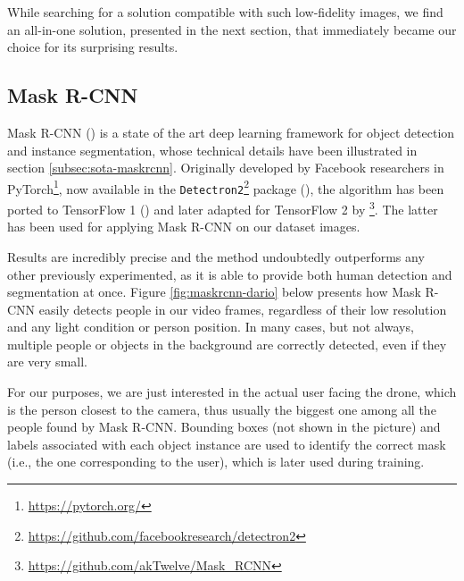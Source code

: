 While searching for a solution compatible with such low-fidelity images, we find an all-in-one solution, presented in the next section, that immediately became our choice for its surprising results.



\subsection{Mask R-CNN}
\label{subsec:masking-maskrcnn}

Mask R-CNN (\cite{he2018mask}) is a state of the art deep learning framework for object detection and instance segmentation, whose technical details have been illustrated in section \ref{subsec:sota-maskrcnn}. Originally developed by Facebook researchers in PyTorch\footnote{\url{https://pytorch.org/}}, now available in the \texttt{Detectron2}\footnote{\url{https://github.com/facebookresearch/detectron2}} package (\cite{wu2019detectron2}), the algorithm has been ported to TensorFlow 1 (\cite{MaskRCNN_matterport}) and later adapted for TensorFlow 2 by \cite{MaskRCNN_akTwelve}\footnote{\url{https://github.com/akTwelve/Mask_RCNN}}. The latter has been used for applying Mask R-CNN on our dataset images.

\medskip

Results are incredibly precise and the method undoubtedly outperforms any other previously experimented, as it is able to provide both human detection and segmentation at once. Figure \ref{fig:maskrcnn-dario} below presents how Mask R-CNN easily detects people in our video frames, regardless of their low resolution and any light condition or person position. In many cases, but not always, multiple people or objects in the background are correctly detected, even if they are very small.

For our purposes, we are just interested in the actual user facing the drone, which is the person closest to the camera, thus usually the biggest one among all the people found by Mask R-CNN. Bounding boxes (not shown in the picture) and labels associated with each object instance are used to identify the correct mask (i.e., the one corresponding to the user), which is later used during training.

